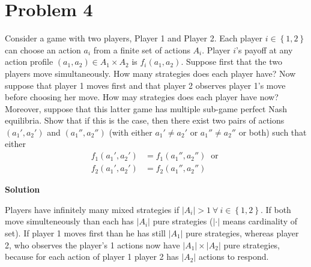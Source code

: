 \documentclass[a4paper]{article}
\begin{document}
\section*{Problem 4}
Consider a game with two players, Player 1 and Player 2. Each player
$i \in \left\{1, 2\right\}$ can choose an action $a_i$ from a finite set of actions $A_i$. Player
$i$’s payoff at any action profile $(a_1, a_2)\in A_1 \times A_2$ is $f_i(a_1, a_2)$. Suppose
first that the two players move simultaneously. How many strategies does
each player have? Now suppose that player 1 moves first and that player 2
observes player 1’s move before choosing her move. How may strategies does
each player have now? Moreover, suppose that this latter game has multiple
sub-game perfect Nash equilibria. Show that if this is the case, then there
exist two pairs of actions $(a_1', a_2')$ and $(a_1'', a_2'')$ (with either $a_1' \neq a_2'$ or
$a_1'' \neq a_2''$ or both) such that either
\begin{align*}
f_1(a_1', a_2') &= f_1(a_1'', a_2'')\ \text{ or }\\
f_2(a_1', a_2') &= f_2(a_1'', a_2'')
\end{align*}


\textbf{Solution}

Players have infinitely many mixed strategies if $|A_i| > 1\ \forall\ i \in \left\{1, 2\right\}$. If both move simulteneously than each has $|A_i|$ pure strategies ($|\cdot|$ means cardinality of set). If player 1 moves first than he has still $|A_1|$ pure strategies, whereas player 2, who observes the player's 1 actions now have $|A_1| \times |A_2|$ pure strategies, because for each action of player 1 player 2 has $|A_2|$ actions to respond.
\end{document}
